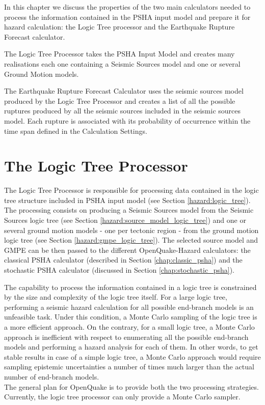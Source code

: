 In this chapter we discuss the properties of the two main calculators 
needed to process the information contained in the PSHA input model 
and prepare it for hazard calculation: the Logic Tree processor and the 
Earthquake Rupture Forecast calculator. 

The Logic Tree Processor takes the PSHA Input Model and creates many 
realisations each one containing a Seismic Sources model and one or 
several Ground Motion models.

The Earthquake Rupture Forecast Calculator uses the seismic sources 
model produced by the Logic Tree Processor and creates a list of all 
the possible ruptures produced by all the seismic sources included in 
the seismic sources model. Each rupture is associated with its probability
of occurrence within the time span defined in the Calculation Settings. 
%
\section{The Logic Tree Processor}
\label{hazard:logic_tree_processor}
%
The Logic Tree Processor is responsible for processing data contained in  
the logic tree structure included in PSHA input model 
(see Section \ref{hazard:logic_tree}). The processing consists on producing a 
Seismic Sources model from the Seismic Sources logic tree (see 
Section \ref{hazard:source_model_logic_tree}) and one or several ground 
motion models - one per tectonic region - from the ground motion logic 
tree (see Section \ref{hazard:gmpe_logic_tree}). 
%
The selected source model and GMPE can be then passed to the different 
OpenQuake-Hazard calculators: the classical PSHA calculator (described 
in Section \ref{chap:classic_psha}) and the stochastic PSHA calculator 
(discussed in Section \ref{chap:stochastic_psha}).

The capability to process the information contained in a logic tree is 
constrained by the size and complexity of the logic tree itself. For a 
large logic tree, performing a seismic hazard calculation for all possible 
end-branch models is an unfeasible task. Under this condition, a Monte Carlo
sampling of the logic tree is a more efficient approach. On the contrary, 
for a small logic tree, a Monte Carlo approach is inefficient with respect
to enumerating all the possible end-branch models and performing a hazard 
analysis for each of them. In other words, to get stable results in case of 
a simple logic tree,  a Monte Carlo approach would require sampling epistemic
uncertainties a number of times much larger than the actual number of 
end-branch models.\\
The general plan for OpenQuake is to provide both the two processing strategies. 
Currently, the logic tree processor can only provide a Monte Carlo sampler.
%
